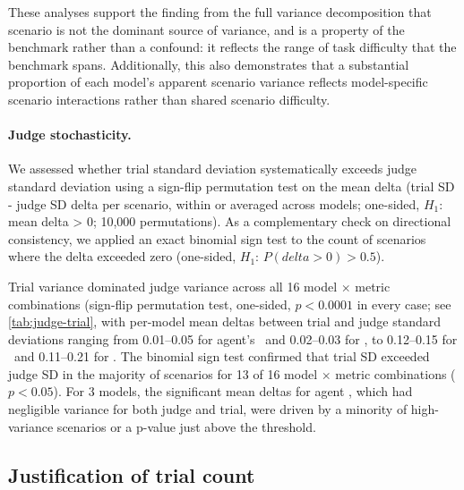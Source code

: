 These analyses support the finding from the full variance decomposition that scenario is not the dominant source of variance, and is a property of the benchmark rather than a confound: it reflects the range of task difficulty that the benchmark spans. Additionally, this also demonstrates that a substantial proportion of each model's apparent scenario variance reflects model-specific scenario interactions rather than shared scenario difficulty.




\paragraph{Judge stochasticity.} We assessed whether trial standard deviation systematically exceeds judge standard deviation using a sign-flip permutation test on the mean delta (trial SD - judge SD delta per scenario, within or averaged across models; one-sided, $H_1$: mean delta > 0; 10,000 permutations). As a complementary check on directional consistency, we applied an exact binomial sign test to the count of scenarios where the delta exceeded zero (one-sided, $H_1$: $P(delta > 0) > 0.5$). 

Trial variance dominated judge variance across all 16 model $\times$ metric combinations (sign-flip permutation test, one-sided, $p < 0.0001$ in every case; see \autoref{tab:judge-trial}, with per-model mean deltas between trial and judge standard deviations ranging from 0.01–0.05 for agent's \metricfidelity~and 0.02–0.03 for \metricconcise, to 0.12–0.15 for \metricconversationprogression~and 0.11–0.21 for \metricfaithfulness. The binomial sign test confirmed that trial SD exceeded judge SD in the majority of scenarios for 13 of 16 model $\times$ metric combinations ($p < 0.05$). For 3 models, the significant mean deltas for agent \metricfidelity, which had negligible variance for both judge and trial, were driven by a minority of high-variance scenarios or a p-value just above the threshold.


%
% 

\subsection{Justification of trial count}
\label{app:trial_count}

